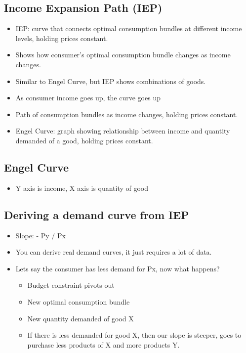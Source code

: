 \documentclass{article}
\begin{document}
\subsection{Income Expansion Path (IEP)}
\begin{itemize}
  \item IEP: curve that connects optimal consumption bundles at different income levels, holding prices constant.
  \item Shows how consumer's optimal consumption bundle changes as income changes.
  \item Similar to Engel Curve, but IEP shows combinations of goods.
  \item As consumer income goes up, the curve goes up
  \item Path of consumption bundles as income changes, holding prices constant.
  \item Engel Curve: graph showing relationship between income and quantity demanded of a good, holding prices constant.
\end{itemize}

\subsection{Engel Curve}
\begin{itemize}
  \item Y axis is income, X axis is quantity of good
\end{itemize}

\subsection{Deriving a demand curve from IEP}
\begin{itemize}
  \item Slope: - Py / Px
  \item You can derive real demand curves, it just
    requires a lot of data.
  \item Lets say the consumer has less demand for Px, now what happens?
    \begin{itemize}
      \item Budget constraint pivots out
      \item New optimal consumption bundle
      \item New quantity demanded of good X
      \item If there is less demanded for good X, then our slope is steeper,
        goes to purchase less products of X and more products Y.
    \end{itemize}
\end{itemize}
\end{document}
